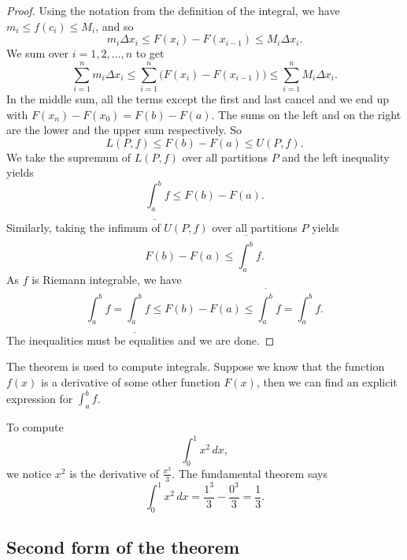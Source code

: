 \begin{proof}
Using the notation from the definition of the integral, we have
$m_i \leq f(c_i) \leq M_i$, and so
\begin{equation*}
m_i \Delta x_i \leq F(x_i) - F(x_{i-1}) \leq M_i \Delta x_i .
\end{equation*}
We sum over $i = 1,2, \ldots, n$ to get
\begin{equation*}
\sum_{i=1}^n m_i \Delta x_i
\leq \sum_{i=1}^n \bigl(F(x_i) - F(x_{i-1}) \bigr)
\leq \sum_{i=1}^n M_i \Delta x_i .
\end{equation*}
In the middle sum, all the terms except the first and last cancel 
and we end up with $F(x_n)-F(x_0) = F(b)-F(a)$.  The sums on the left
and on the right are the lower and the upper sum respectively.  So
\begin{equation*}
L(P,f) \leq F(b)-F(a) \leq U(P,f) .
\end{equation*}
We take the supremum of $L(P,f)$ over all partitions $P$ and the left inequality
yields 
\begin{equation*}
\underline{\int_a^b} f \leq F(b)-F(a) .
\end{equation*}
Similarly, taking
the infimum of $U(P,f)$ over all partitions $P$ yields
\begin{equation*}
F(b)-F(a) \leq \overline{\int_a^b} f .
\end{equation*}
As $f$ is Riemann integrable, we have
\begin{equation*}
\int_a^b f =
\underline{\int_a^b} f \leq F(b)-F(a) \leq \overline{\int_a^b} f
= \int_a^b f .
\end{equation*}
The inequalities must be equalities and we are done.
\end{proof}

The theorem is used to compute integrals.  Suppose we know that
the function $f(x)$ is a derivative of some other function $F(x)$,
then we can find an explicit expression for $\int_a^b f$. 

\begin{example}
To compute
\begin{equation*}
\int_0^1 x^2 \,dx ,
\end{equation*}
we notice $x^2$ is the derivative of $\frac{x^3}{3}$.
The fundamental theorem says
\begin{equation*}
\int_0^1 x^2 \,dx =
\frac{1^3}{3}
-
\frac{0^3}{3}
= \frac{1}{3}.
\end{equation*}
\end{example}

\subsection{Second form of the theorem}

